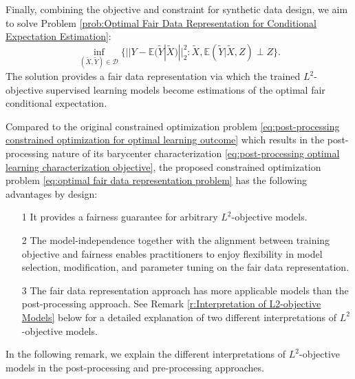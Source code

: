 \documentclass[twoside,11pt]{article}
\begin{document}
Finally, combining the objective and constraint for synthetic data design, we aim to solve Problem \ref{prob:Optimal Fair Data Representation for Conditional Expectation Estimation}:
\begin{equation}
\inf_{(\tilde{X}, \tilde{Y}) \in \mathcal{D}} \{ ||Y - \mathbb{E}(\tilde{Y}|\tilde{X})||^2_2 : \tilde{X}, \mathbb{E}(\tilde{Y}|\tilde{X},Z) \perp Z\}.
\end{equation}
The solution provides a fair data representation via which the trained $L^2$-objective supervised learning models become estimations of the optimal fair conditional expectation.

Compared to the original constrained optimization problem \eqref{eq:post-processing constrained optimization for optimal learning outcome} which results in the post-processing nature of its barycenter characterization \eqref{eq:post-processing optimal learning characterization objective}, the proposed constrained optimization problem \eqref{eq:optimal fair data representation problem} has the following advantages by design:
\begin{itemize}
\item[1] It provides a fairness guarantee for arbitrary $L^2$-objective models.
\item[2] The model-independence together with the alignment between training objective and fairness enables practitioners to enjoy flexibility in model selection, modification, and parameter tuning on the fair data representation.
\item[3] The fair data representation approach has more applicable models than the post-processing approach. See Remark \ref{r:Interpretation of L2-objective Models} below for a detailed explanation of two different interpretations of $L^2$-objective models.
\end{itemize}

In the following remark, we explain the different interpretations of $L^2$-objective models in the post-processing and pre-processing approaches.
\end{document}
